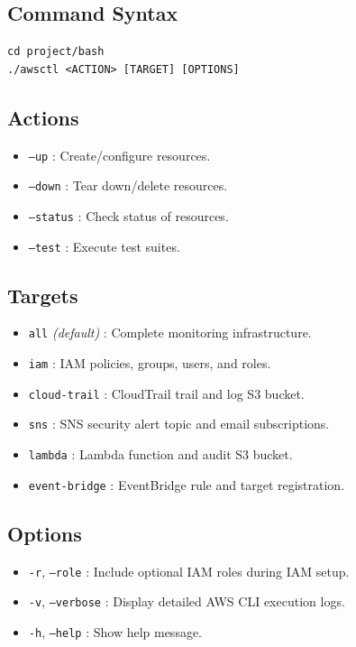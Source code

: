 \documentclass[11pt,a4paper]{report}
\begin{document}
\subsection{Command Syntax}

\begin{lstlisting}
cd project/bash
./awsctl <ACTION> [TARGET] [OPTIONS]
\end{lstlisting}

\subsection{Actions}

\begin{itemize}[leftmargin=1.4em]
  \item \texttt{--up} : Create/configure resources.
  \item \texttt{--down} : Tear down/delete resources.
  \item \texttt{--status} : Check status of resources.
  \item \texttt{--test} : Execute test suites.
\end{itemize}

\subsection{Targets}

\begin{itemize}[leftmargin=1.4em]
  \item \texttt{all} \textit{(default)} : Complete monitoring infrastructure.
  \item \texttt{iam} : IAM policies, groups, users, and roles.
  \item \texttt{cloud-trail} : CloudTrail trail and log S3 bucket.
  \item \texttt{sns} : SNS security alert topic and email subscriptions.
  \item \texttt{lambda} : Lambda function and audit S3 bucket.
  \item \texttt{event-bridge} : EventBridge rule and target registration.
\end{itemize}

\subsection{Options}

\begin{itemize}[leftmargin=1.4em]
  \item \texttt{-r}, \texttt{--role} : Include optional IAM roles during IAM setup.
  \item \texttt{-v}, \texttt{--verbose} : Display detailed AWS CLI execution logs.
  \item \texttt{-h}, \texttt{--help} : Show help message.
\end{itemize}
\end{document}

